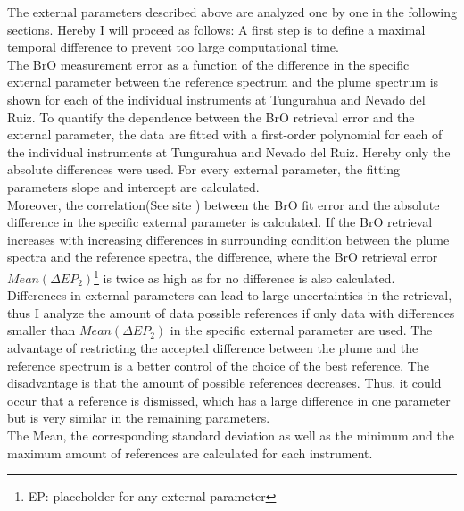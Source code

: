 The external parameters described above are analyzed one by one in the following sections. Hereby I will proceed as follows:
A first step is to define a maximal temporal difference to prevent too large computational time.\\
The BrO measurement error as a function of the difference in the specific external parameter between the reference spectrum and the plume spectrum is shown for each of the individual instruments at Tungurahua and Nevado del Ruiz. 
To quantify the dependence between the BrO retrieval error and the external parameter, the data are fitted with a first-order polynomial for each of the individual instruments at Tungurahua and Nevado del Ruiz. Hereby only the absolute differences were used. For every external parameter, the fitting parameters slope and intercept are calculated.\\
Moreover, the correlation(See site \pageref{ff})  between the BrO fit error and the absolute difference in the specific external parameter is calculated. If the BrO retrieval increases with increasing differences in surrounding condition between the plume spectra and the reference spectra, the difference, where the BrO retrieval error $Mean(\Delta EP_{2})$\footnote{EP: placeholder for any external parameter} is twice as high as for no difference is also calculated.\\  
Differences in external parameters can lead to large uncertainties in the retrieval, thus I analyze the amount of data possible references if only data with differences smaller than $Mean(\Delta EP_{2})$ in the specific external parameter are used. 
The advantage of restricting the accepted difference between the plume and the reference spectrum is a better control of the choice of the best reference. The disadvantage is that the amount of possible references decreases. Thus, it could occur that a reference is dismissed, which has a large difference in one parameter but is very similar in the remaining parameters.\\
The Mean, the corresponding standard deviation as well as the minimum and the maximum amount of references are calculated for each instrument.

